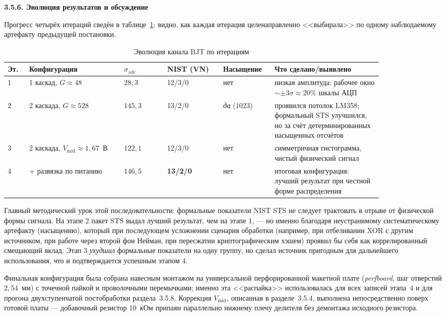 \textbf{3.5.6. Эволюция результатов и обсуждение}

Прогресс четырёх итераций сведён в таблице~\ref{tab:bjt_evolution}: видно, как каждая
итерация целенаправленно <<выбирала>> по одному наблюдаемому артефакту предыдущей
постановки.

\begin{table}[htbp]
  \centering
  \footnotesize
  \caption{Эволюция канала BJT по итерациям}
  \label{tab:bjt_evolution}
  \begin{tabular}{|p{0.05\linewidth}|p{0.22\linewidth}|p{0.10\linewidth}|p{0.13\linewidth}|p{0.10\linewidth}|p{0.25\linewidth}|}
    \hline
    Эт. & Конфигурация & $\sigma_\mathrm{adc}$ & NIST (VN) & Насы\-щение & Что сделано/выявлено \\
    \hline
    1 & 1 каскад, $G\!\approx\!48$ & $28{,}3$ & 12/3/0 & нет & низкая амплитуда: рабочее окно ${\sim}\pm 3\sigma\approx 20\%$ шкалы АЦП \\
    \hline
    2 & 2 каскада, $G\!\approx\!528$ & $145{,}3$ & 13/2/0 & \emph{да} ($1023$) & проявился потолок LM358; формальный STS улучшился, но за счёт детерминированных насыщенных отсчётов \\
    \hline
    3 & 2 каскада, $V_\mathrm{mid}\!\approx\!1{,}67$~В & $122{,}1$ & 12/3/0 & нет & симметричная гистограмма, чистый физический сигнал \\
    \hline
    4 & + развязка по питанию & $146{,}5$ & \textbf{13/2/0} & нет & итоговая конфигурация: лучший результат при честной форме распределения \\
    \hline
  \end{tabular}
\end{table}

Главный методический урок этой последовательности: формальные показатели NIST STS
не следует трактовать в отрыве от физической формы сигнала. На этапе 2 пакет STS
выдал лучший результат, чем на этапе 1, --- но именно благодаря неустранимому
систематическому артефакту (насыщению), который при последующем усложнении сценария
обработки (например, при отбеливании XOR с другим источником, при работе через
второй фон Нейман, при пересжатии криптографическим хэшем) проявил бы себя как
коррелированный смещающий вклад. Этап 3 \emph{ухудшил} формальные показатели на одну
группу, но сделал источник пригодным для дальнейшего использования, что и
подтверждается успешным этапом 4.

Финальная конфигурация была собрана навесным монтажом на универсальной перфорированной
макетной плате (\textit{perfboard}, шаг отверстий $2{,}54$~мм) с точечной пайкой и
проволочными перемычками; именно эта <<распайка>> использовалась для всех записей
этапа~4 и для прогона двухступенчатой постобработки раздела~3.5.8. Коррекция
$V_\mathrm{mid}$, описанная в разделе~3.5.4, выполнена непосредственно поверх
готовой платы --- добавочный резистор $10$~кОм припаян параллельно нижнему плечу
делителя без демонтажа исходного резистора.

